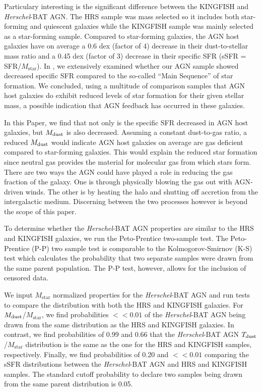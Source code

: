 \documentclass[fleqn, usenatbib]{mnras}
\newcommand{\herschel}{\emph{Herschel}}
\newcommand{\mstar}{$M_{\mathrm{star}}$}
\newcommand{\mdust}{$M_{\rm dust}$}
\newcommand{\tdust}{$T_{\rm dust}$}
\begin{document}
Particulary interesting is the significant difference between the KINGFISH and \herschel-BAT AGN. The HRS sample was mass selected so it includes both star-forming and quiescent galaxies while the KINGFISH sample was mainly selected as a star-forming sample. Compared to star-forming galaxies, the AGN host galaxies have on average a 0.6 dex (factor of 4) decrease in their dust-to-stellar mass ratio and a 0.45 dex (factor of 3) decrease in their specific SFR (sSFR = SFR/\mstar). In \citet{Shimizu:2015xo}, we extensively examined whether our AGN sample showed decreased specific SFR compared to the so-called ``Main Sequence'' of star formation. We concluded, using a multitude of comparison samples that AGN host galaxies do exhibit reduced levels of star formation for their given stellar mass, a possible indication that AGN feedback has occurred in these galaxies. 
 
In this Paper, we find that not only is the specific SFR decreased in AGN host galaxies, but \mdust{} is also decreased. Assuming a constant dust-to-gas ratio, a reduced \mdust{} would indicate AGN host galaxies on average are gas deficient compared to star-forming galaxies. This would explain the reduced star formation since neutral gas provides the material for molecular gas from which stars form. There are two ways the AGN could have played a role in reducing the gas fraction of the galaxy. One is through physically blowing the gas out with AGN-driven winds. The other is by heating the halo and shutting off accretion from the intergalactic medium. Discerning between the two processes however is beyond the scope of this paper.

To determine whether the \herschel-BAT AGN properties are similar to the HRS and KINGFISH galaxies, we run the Peto-Prentice two-sample test. The Peto-Prentice (P-P) two sample test is comparable to the Kolmogorov-Smirnov (K-S) test which calculates the probability that two separate samples were drawn from the same parent population.  The P-P test, however, allows for the inclusion of censored data. 

We input \mstar{} normalized properties for the \herschel-BAT AGN and run tests to compare the distribution with both the HRS and KINGFISH galaxies. For \mdust/\mstar{}, we find probabilities $<<0.01$ of the \herschel-BAT AGN being drawn from the same distribution as the HRS and KINGFISH galaxies. In contrast, we find probabilities of 0.99 and 0.66 that the \herschel-BAT AGN \tdust/\mstar{} distribution is the same as the one for the HRS and KINGFISH samples, respectively. Finally, we find probabilities of 0.20 and $<<0.01$ comparing the sSFR distributions between the \herschel-BAT AGN and HRS and KINGFISH samples. The standard cutoff probability to declare two samples being drawn from the same parent distribution is 0.05. 
\end{document}
